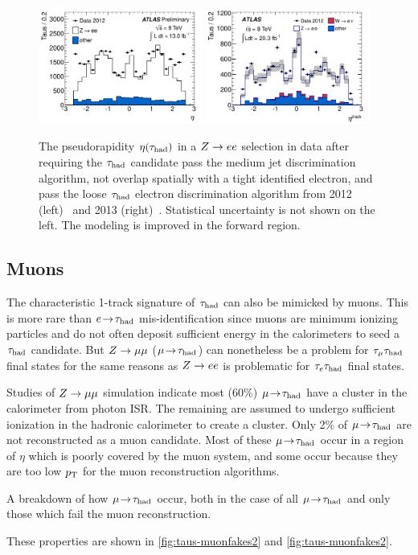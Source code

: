 \begin{figure}[tp]
  \centering
  \includegraphics[width=0.48\textwidth]{figures/ATLAS-CONF-2013-064/fig_22b}
  \includegraphics[width=0.48\textwidth]{figures/PERF-2013-06/fig_14b}
  \caption{The pseudorapidity $\eta(\tauh)$ in a $Z \rightarrow ee$ selection in data after requiring the $\tau_\text{had}$ candidate pass the medium jet discrimination algorithm, not overlap spatially with a tight identified electron, and pass the loose $\tau_\text{had}$ electron discrimination algorithm from 2012 (left)~\cite{ATLAS-CONF-2013-064} and 2013 (right)~\cite{PERF-2013-06}. Statistical uncertainty is not shown on the left. The modeling is improved in the forward region.}
  \label{fig:taus-electronfakes3}
\end{figure}

\subsection{Muons}

The characteristic 1-track signature of $\tau_\text{had}$ can also be mimicked by muons. This is more rare than $e \!\rightarrow\!\tau_\text{had}$ mis-identification since muons are minimum ionizing particles and do not often deposit sufficient energy in the calorimeters to seed a $\tau_\text{had}$ candidate. But $Z \rightarrow \mu\mu$ ($\mu \!\rightarrow\!\tau_\text{had}$) can nonetheless be a problem for $\tau_\mu \tau_\text{had}$ final states for the same reasons as $Z \rightarrow ee$ is problematic for $\tau_e \tau_\text{had}$ final states.

Studies of $Z \rightarrow \mu\mu$ simulation indicate most (60\%) $\mu \!\rightarrow\!\tau_\text{had}$ have a cluster in the calorimeter from photon ISR. The remaining are assumed to undergo sufficient ionization in the hadronic calorimeter to create a cluster. Only 2\% of $\mu \!\rightarrow\!\tau_\text{had}$ are not reconstructed as a muon candidate. Most of these $\mu \!\rightarrow\!\tau_\text{had}$ occur in a region of $\eta$ which is poorly covered by the muon system, and some occur because they are too low $p_{\mathrm{T}}$ for the muon reconstruction algorithms.
%
\begin{table}[bp] 
  \centering
  \renewcommand{\arraystretch}{1.4}
  \caption{A breakdown of how $\mu \!\rightarrow\!\tau_\text{had}$ occur, both in the case of all $\mu \!\rightarrow\!\tau_\text{had}$ and only those which fail the muon reconstruction.}
  
  \label{tab:taus-muonfakes}
\end{table}
%
These properties are shown in \cref{fig:taus-muonfakes2} and \cref{fig:taus-muonfakes2}.

